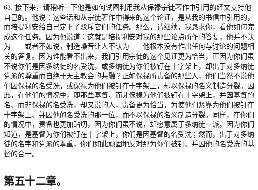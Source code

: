 63. 接下来，请稍听一下他是如何试图利用我从保禄宗徒著作中引用的经文支持他自己的。他说：这些话和从宗徒著作中得来的这个论证，是从我的书信中引用的，而培提利安给自己定下了驳斥它们的任务。那么，请继续，我恳求你，看他如何完成这个任务。因为他说道：这就是培提利安对我的那些论点所作的答复，他并不认为——或者不如说，制造噪音让人不认为——他根本没有作出任何与讨论的问题相关的答复。因为谁能看不出来，我们引用宗徒的这个见证更为恰当，正因为你们虽不说你们是因多纳徒的名受洗，或多纳徒为你们被钉在十字架上，却出于对多纳徒党派的尊重而自绝于天主教会的共融？正如保禄所责备的那些人，他们当然不说他们因保禄的名受洗，或保禄为他们被钉在十字架上，却以保禄的名义制造分裂。因此，在他们的情况中，即那些基督、而非保禄为他们被钉在十字架上，并因基督的名、而非保禄的名受洗，却又说的人，责备更为恰当，为使他们紧靠为他们被钉在十字架上、并因他的名受洗的那一位，而不以保禄的名义制造分裂。同样，在你们的情况中，责备也更加贴切，因为你们虽不说，却愿意属于多纳徒一派。因为你们知道，是基督为你们被钉在十字架上，你们是因基督的名受洗；然而，出于对多纳徒的名字和党派的尊重，你们如此顽固地反对那为你们被钉、并因他的名受洗的基督的合一。\par


\subsection{第五十二章。}


